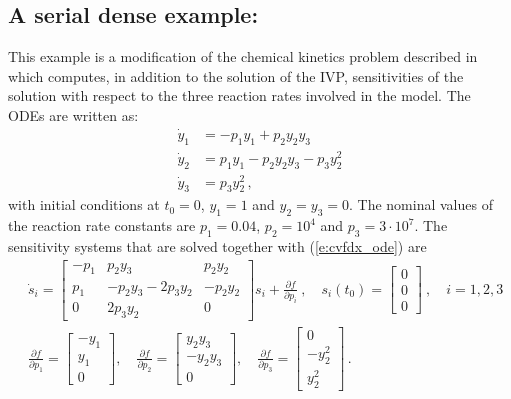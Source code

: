 
\newpage
\subsection{A serial dense example: }
\label{ss:cvfdx}

This example is a modification of the chemical kinetics problem described 
in~\cite{cvode2.4.0_ex} which computes, in addition to the solution of the
IVP, sensitivities of the solution with respect to the three reaction rates 
involved in the model. The ODEs are written as:
\begin{equation}\label{e:cvfdx_ode}
  \begin{split}
    {\dot y}_1 &= -p_1 y_1 + p_2 y_2 y_3   \\
    {\dot y}_2 &=  p_1 y_1 - p_2 y_2 y_3 - p_3 y_2^2 \\
    {\dot y}_3 &=  p_3 y_2^2 \, ,
  \end{split}
\end{equation}
with initial conditions at $t_0 = 0$, $y_1 = 1$ and $y_2 = y_3 = 0$. 
The nominal values of the reaction rate constants are 
$p_1 = 0.04$, $p_2 = 10^4$ and $p_3 = 3\cdot 10^7$.
The sensitivity systems that are solved together with (\ref{e:cvfdx_ode}) are
\begin{equation}\label{e:cvfdx_sens}
  \begin{split}
    & {\dot s}_i = 
    \begin{bmatrix}
      - p_1 &   p_2 y_3             &   p_2 y_2 \\
        p_1 & - p_2 y_3 - 2 p_3 y_2 & - p_2 y_2 \\
        0   &             2 p_3 y_2 &  0              
    \end{bmatrix}
    s_i + \frac{\partial f}{\partial p_i} ~,
    \quad s_i(t_0) = \begin{bmatrix} 0 \\ 0 \\ 0 \end{bmatrix}  ~,
    \quad i = 1,2,3 \\
    & \frac{\partial f}{\partial p_1} = \begin{bmatrix} -y_1 \\ y_1 \\ 0 \end{bmatrix}, \quad
    \frac{\partial f}{\partial p_2} = \begin{bmatrix} y_2 y_3 \\ -y_2 y_3 \\ 0 \end{bmatrix}, \quad
    \frac{\partial f}{\partial p_3} = \begin{bmatrix} 0 \\ - y_2^2 \\ y_2^2 \end{bmatrix} \, .
  \end{split}
\end{equation}

